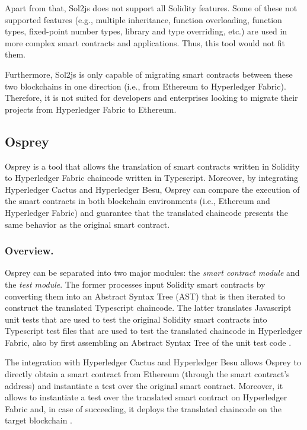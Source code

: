 \documentclass[runningheads]{llncs}
\begin{document}
Apart from that, Sol2js does not support all Solidity features. Some of these not supported features (e.g., multiple inheritance, function overloading, function types, fixed-point number types, library and type overriding, etc.) are used in more complex smart contracts and applications. Thus, this tool would not fit them.

Furthermore, Sol2js is only capable of migrating smart contracts between these two blockchains in one direction (i.e., from Ethereum to Hyperledger Fabric). Therefore, it is not suited for developers and enterprises looking to migrate their projects from Hyperledger Fabric to Ethereum.


\subsection{Osprey} \label{osprey}
Osprey \cite{abrunhosa_2021} is a tool that allows the translation of smart contracts written in Solidity to Hyperledger Fabric chaincode written in Typescript. Moreover, by integrating Hyperledger Cactus and Hyperledger Besu, Osprey can compare the execution of the smart contracts in both blockchain environments (i.e., Ethereum and Hyperledger Fabric) and guarantee that the translated chaincode presents the same behavior as the original smart contract.

\subsubsection{Overview.}
Osprey can be separated into two major modules: the \textit{smart contract module} and the \textit{test module}. The former processes input Solidity smart contracts by converting them into an Abstract Syntax Tree (AST) that is then iterated to construct the translated Typescript chaincode. The latter translates Javascript unit tests that are used to test the original Solidity smart contracts into Typescript test files that are used to test the translated chaincode in Hyperledger Fabric, also by first assembling an Abstract Syntax Tree of the unit test code \cite{abrunhosa_2021}.

The integration with Hyperledger Cactus and Hyperledger Besu allows Osprey to directly obtain a smart contract from Ethereum (through the smart contract's address) and instantiate a test over the original smart contract. Moreover, it allows to instantiate a test over the translated smart contract on Hyperledger Fabric and, in case of succeeding, it deploys the translated chaincode on the target blockchain \cite{abrunhosa_2021}.
\end{document}
